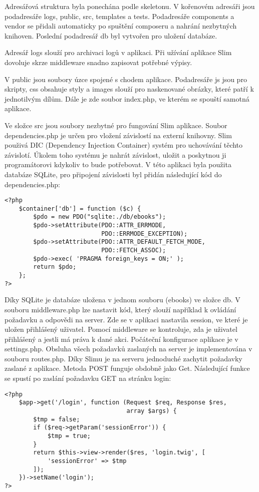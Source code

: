             Adresářová struktura byla ponechána podle skeletonu. V kořenovém adresáři jsou podadresáře logs, public, src, templates a tests. Podadresáře components a vendor se přidali automaticky po spuštění composeru a nahrání nezbytných knihoven. Poslední podadresář db byl vytvořen pro uložení databáze.

            Adresář logs slouží pro archivaci logů v aplikaci. Při užívání aplikace Slim dovoluje skrze middleware snadno zapisovat potřebné výpisy.
            
            V public jsou soubory úzce spojené s chodem aplikace. Podadresáře js jsou pro skripty, css obsahuje styly a images slouží pro naskenované obrázky, které patří k jednotilvým dílům. Dále je zde soubor index.php, ve kterém se spouští samotná aplikace.
            
            Ve složce src jsou soubory nezbytné pro fungování Slim aplikace. Soubor dependencies.php je určen pro vložení závislostí na externí knihovny. Slim použivá DIC (Dependency Injection Container) systém pro uchovávání těchto závislotí. Úkolem toho systému je nahrát závislost, uložit a poskytnou ji programátorovi kdykoliv to bude potřebovat. V této aplikaci byla použita databáze SQLite, pro připojení závislosti byl přidán následující kód do dependencies.php:
            \begin{verbatim}
<?php
    $container['db'] = function ($c) {
        $pdo = new PDO("sqlite:./db/ebooks");
        $pdo->setAttribute(PDO::ATTR_ERRMODE, 
                           PDO::ERRMODE_EXCEPTION);
        $pdo->setAttribute(PDO::ATTR_DEFAULT_FETCH_MODE, 
                           PDO::FETCH_ASSOC);
        $pdo->exec( 'PRAGMA foreign_keys = ON;' );
        return $pdo;
    };
?>
            \end{verbatim}
            Díky SQLite je databáze uložena v jednom souboru (ebooks) ve složce db. V souboru middleware.php lze nastavit kód, který slouží například k ovládání požadavku a odpovědi na server. Zde se v aplikaci nastavila session, ve které je uložen přihlášený uživatel. Pomocí middleware se kontroluje, zda je uživatel přihlášený a jestli má práva k dané akci.  Počáteční konfigurace aplikace je v settings.php. Obsluha všech požadavků zaslaných na server je implementována v souboru routes.php. Díky Slimu je na serveru jednoduché zachytit požadavky zaslané z aplikace. Metoda POST funguje obdobně jako Get. Následující funkce se spustí po zaslání požadavku GET na stránku login:
            \pagebreak
            \begin{verbatim}
<?php
    $app->get('/login', function (Request $req, Response $res, 
                                  array $args) {
        $tmp = false;
        if ($req->getParam('sessionError')) {
            $tmp = true;
        }
        return $this->view->render($res, 'login.twig', [
            'sessionError' => $tmp
        ]);
    })->setName('login');
?>
            \end{verbatim}
            

